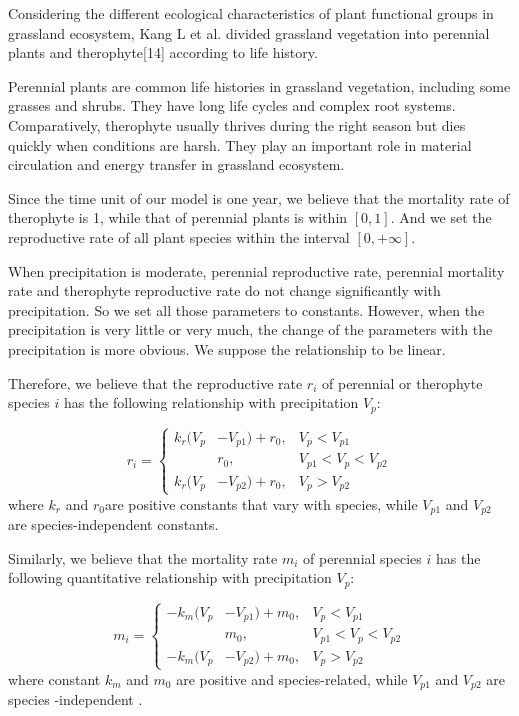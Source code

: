 \documentclass{mcmthesis}
\begin{document}
Considering the different ecological characteristics of plant functional groups in grassland ecosystem, Kang L et al. divided grassland vegetation into perennial plants and therophyte[14] according to life history.

Perennial plants are common life histories in grassland vegetation, including some grasses and shrubs. They have long life cycles and complex root systems. Comparatively, therophyte usually thrives during the right season but dies quickly when conditions are harsh. They play an important role in material circulation and energy transfer in grassland ecosystem.

Since the time unit of our model is one year, we believe that the mortality rate of therophyte is 1, while that of perennial plants is within $[0,1]$. And we set the reproductive rate of all plant species within the interval $[0,+∞]$.

When precipitation is moderate, perennial  reproductive rate, perennial mortality rate and therophyte reproductive rate do not change significantly with precipitation. So we set all those parameters to constants. However, when the precipitation is very little or very much, the change of the parameters with the precipitation is more obvious. We suppose the relationship to be linear.

Therefore, we believe that the reproductive rate $r_i$ of perennial or therophyte species $i$ has the following relationship with precipitation $V_p$:

\begin{equation}
	\label{eq1}
	r_i=\left\{
	\begin{aligned}
		k_{r}(V_p& -V_{p1})+r_0, & V_p<V_{p1} \\
		&r_0,&V_{p1}<V_p<V_{p2} \\
		k_{r}(V_p& -V_{p2})+r_0, & V_p>V_{p2} 
	\end{aligned}
	\right.
\end{equation}
where $k_r$ and $r_0 $are positive constants that vary with species, while $V_{p1}$ and $V_{p2}$ are species-independent constants.

Similarly, we believe that the mortality rate $m_i$ of perennial species $i$ has the following quantitative relationship with precipitation $V_p$:

\begin{equation}
	\label{eq2}
	m_i=\left\{
	\begin{aligned}
		-k_{m}(V_p& -V_{p1})+m_0, & V_p<V_{p1} \\
		&m_0,&V_{p1}<V_p<V_{p2} \\
		-k_{m}(V_p& -V_{p2})+m_0, & V_p>V_{p2} 
	\end{aligned}
	\right.
\end{equation}
where constant $k_m$ and $m_0$ are positive and species-related, while $V_{p1}$ and $V_{p2}$ are species -independent .
\end{document}
